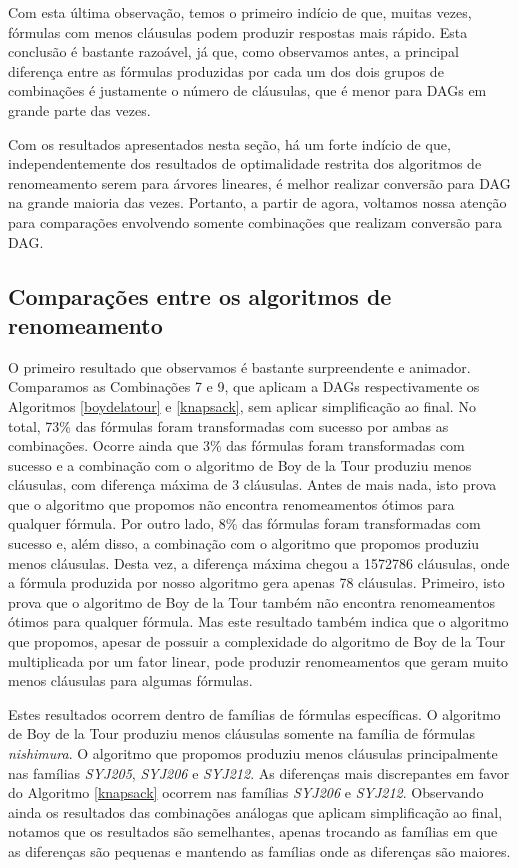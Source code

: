 Com esta última observação, temos o primeiro indício de que, muitas vezes, fórmulas com menos cláusulas podem produzir respostas mais rápido. Esta conclusão é bastante razoável, já que, como observamos antes, a principal diferença entre as fórmulas produzidas por cada um dos dois grupos de combinações é justamente o número de cláusulas, que é menor para DAGs em grande parte das vezes.

Com os resultados apresentados nesta seção, há um forte indício de que, independentemente dos resultados de optimalidade restrita dos algoritmos de renomeamento serem para árvores lineares, é melhor realizar conversão para DAG na grande maioria das vezes. Portanto, a partir de agora, voltamos nossa atenção para comparações envolvendo somente combinações que realizam conversão para DAG.


\subsection{Comparações entre os algoritmos de renomeamento}

\indent

O primeiro resultado que observamos é bastante surpreendente e animador. Comparamos as Combinações 7 e 9, que aplicam a DAGs respectivamente os Algoritmos \ref{boydelatour} e \ref{knapsack}, sem aplicar simplificação ao final. No total, 73\% das fórmulas foram transformadas com sucesso por ambas as combinações. Ocorre ainda que 3\% das fórmulas foram transformadas com sucesso e a combinação com o algoritmo de Boy de la Tour produziu menos cláusulas, com diferença máxima de 3 cláusulas. Antes de mais nada, isto prova que o algoritmo que propomos não encontra renomeamentos ótimos para qualquer fórmula. Por outro lado, 8\% das fórmulas foram transformadas com sucesso e, além disso, a combinação com o algoritmo que propomos produziu menos cláusulas. Desta vez, a diferença máxima chegou a 1572786 cláusulas, onde a fórmula produzida por nosso algoritmo gera apenas 78 cláusulas. Primeiro, isto prova que o algoritmo de Boy de la Tour também não encontra renomeamentos ótimos para qualquer fórmula. Mas este resultado também indica que o algoritmo que propomos, apesar de possuir a complexidade do algoritmo de Boy de la Tour multiplicada por um fator linear, pode produzir renomeamentos que geram muito menos cláusulas para algumas fórmulas.

Estes resultados ocorrem dentro de famílias de fórmulas específicas. O algoritmo de Boy de la Tour produziu menos cláusulas somente na família de fórmulas \emph{nishimura}. O algoritmo que propomos produziu menos cláusulas principalmente nas famílias \emph{SYJ205}, \emph{SYJ206} e \emph{SYJ212}. As diferenças mais discrepantes em favor do Algoritmo \ref{knapsack} ocorrem nas famílias \emph{SYJ206} e \emph{SYJ212}. Observando ainda os resultados das combinações análogas que aplicam simplificação ao final, notamos que os resultados são semelhantes, apenas trocando as famílias em que as diferenças são pequenas e mantendo as famílias onde as diferenças são maiores.

